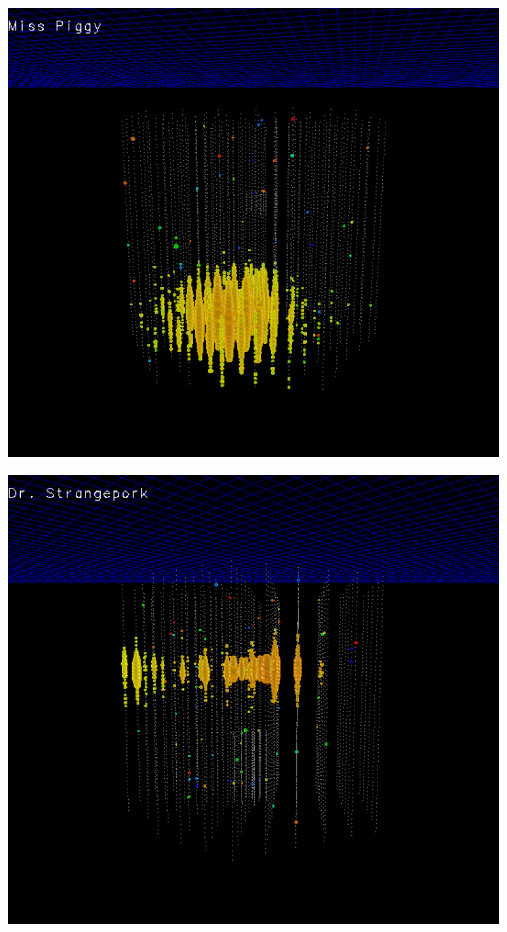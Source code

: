 \newpage

\begin{center}
\includegraphics[keepaspectratio,width=13cm]{miss-piggy}
\end{center}

\Tr
{}%
\begin{center}
\includegraphics[keepaspectratio,width=13cm]{dr-strangepork}
\end{center}

